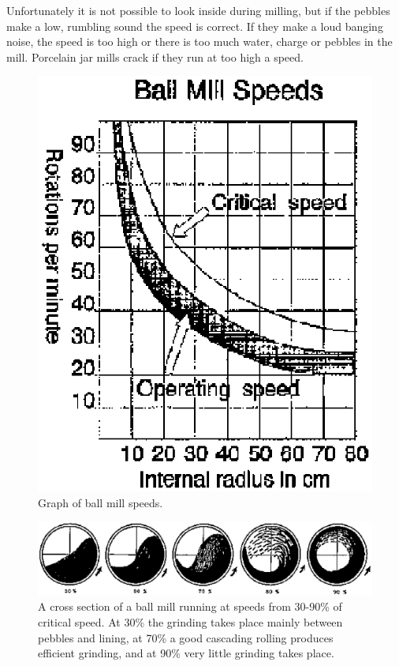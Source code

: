 Unfortunately it is not possible to look inside during milling, but if the 
pebbles make a low, rumbling sound the speed is correct. If they make a loud 
banging noise, the speed is too high or there is too much water, charge or 
pebbles in the mill. Porcelain jar mills crack if they run at too high a speed.
\begin{figure}[htbp!]
  \centering
  \includegraphics[width=0.8\linewidth]{img/ballmillspeed.eps}
  \caption{Graph of ball mill speeds.}
  \label{fig:ballmillspeed}
\end{figure}
\begin{figure}[htbp!]
  \centering
  \includegraphics[width=0.8\linewidth]{img/ballmillefficient.eps}
  \caption{A cross section of a ball mill running at speeds from 30-90\% of 
  critical speed. At 30\% the grinding takes place mainly between pebbles and 
  lining, at 70\% a good cascading rolling produces efficient grinding, and at 
  90\% very little grinding takes place.}
  \label{fig:ballmillefficient}
\end{figure}
